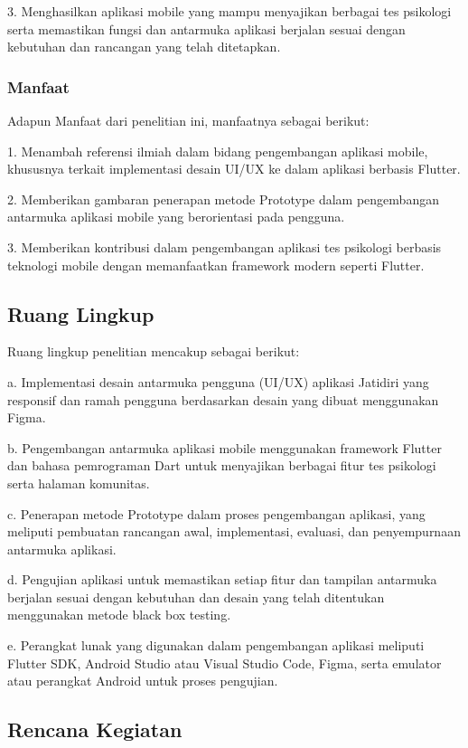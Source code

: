 3. Menghasilkan aplikasi mobile yang mampu menyajikan berbagai tes psikologi serta memastikan fungsi dan antarmuka aplikasi berjalan sesuai dengan kebutuhan dan rancangan yang telah ditetapkan.

\subsubsection{Manfaat}

Adapun Manfaat dari penelitian ini, manfaatnya sebagai berikut:

1. Menambah referensi ilmiah dalam bidang pengembangan aplikasi mobile, khususnya terkait implementasi desain UI/UX ke dalam aplikasi berbasis Flutter.

2. Memberikan gambaran penerapan metode Prototype dalam pengembangan antarmuka aplikasi mobile yang berorientasi pada pengguna.

3. Memberikan kontribusi dalam pengembangan aplikasi tes psikologi berbasis teknologi mobile dengan memanfaatkan framework modern seperti Flutter.

\subsection{Ruang Lingkup}

Ruang lingkup penelitian mencakup sebagai berikut:

a. Implementasi desain antarmuka pengguna (UI/UX) aplikasi Jatidiri yang responsif dan ramah pengguna berdasarkan desain yang dibuat menggunakan Figma.

b. Pengembangan antarmuka aplikasi mobile menggunakan framework Flutter dan bahasa pemrograman Dart untuk menyajikan berbagai fitur tes psikologi serta halaman komunitas.

c. Penerapan metode Prototype dalam proses pengembangan aplikasi, yang meliputi pembuatan rancangan awal, implementasi, evaluasi, dan penyempurnaan antarmuka aplikasi.

d. Pengujian aplikasi untuk memastikan setiap fitur dan tampilan antarmuka berjalan sesuai dengan kebutuhan dan desain yang telah ditentukan menggunakan metode black box testing.

e. Perangkat lunak yang digunakan dalam pengembangan aplikasi meliputi Flutter SDK, Android Studio atau Visual Studio Code, Figma, serta emulator atau perangkat Android untuk proses pengujian.

\subsection{Rencana Kegiatan}

